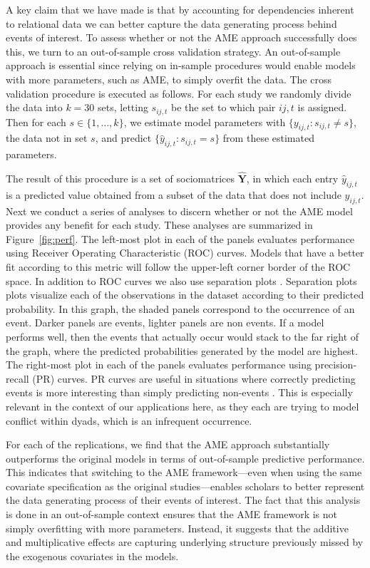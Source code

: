 \documentclass[12pt]{amsart}
\begin{document}
A key claim that we have made is that by accounting for dependencies inherent to relational data we can better capture the data generating process behind events of interest. To assess whether or not the AME approach successfully does this, we turn to an out-of-sample cross validation strategy. An out-of-sample approach is essential since relying on in-sample procedures would enable models with more parameters, such as AME, to simply overfit the data. The cross validation procedure is executed as follows. For each study  we randomly divide the data into $k=30$ sets, letting $s_{ij,t}$ be the set to which pair $ij,t$ is assigned. Then for each $s \in \{1,\ldots,k\}$, we estimate model parameters with $\{y_{ij,t}: s_{ij,t} \neq s\}$, the data not in set $s$, and predict $\{\hat{y}_{ij,t}: s_{ij,t} = s\}$ from these estimated parameters.

The result of this procedure is a set of sociomatrices $\bm \hat Y$, in which each entry $\hat y_{ij,t}$ is a predicted value obtained from a subset of the data that does not include $y_{ij,t}$. Next we conduct a series of analyses to discern whether or not the AME model provides any benefit for each study. These analyses are summarized in Figure~\ref{fig:perf}. The left-most plot in each of the panels evaluates performance using Receiver Operating Characteristic (ROC) curves. Models that have a better fit according to this metric will follow the upper-left corner border of the ROC space. In addition to ROC curves we also use separation plots \citep{greenhill:etal:2011}.  Separation plots plots visualize each of the observations in the dataset according to their predicted probability. In this graph, the shaded panels correspond to the occurrence of an event. Darker panels are events, lighter panels are non events. If a model performs well, then the events that actually occur would stack to the far right of the graph, where the predicted probabilities generated by the model are highest. The right-most plot in each of the panels evaluates performance using precision-recall (PR) curves. PR curves are useful in situations where correctly predicting events is more interesting than simply predicting non-events \citep{davis:goadrich:2006}. This is especially relevant in the context of our applications here, as they each are trying to model conflict within dyads, which is an infrequent occurrence.

For each of the replications, we find that the AME approach substantially outperforms the original models in terms of out-of-sample predictive performance. This indicates that switching to the AME framework---even when using the same covariate specification as the original studies---enables scholars to better represent the data generating process of their events of interest. The fact that this analysis is done in an out-of-sample context ensures that the AME framework is not simply overfitting with more parameters. Instead, it suggests that the additive and multiplicative effects are capturing underlying structure previously missed by the exogenous covariates in the models.
\end{document}

